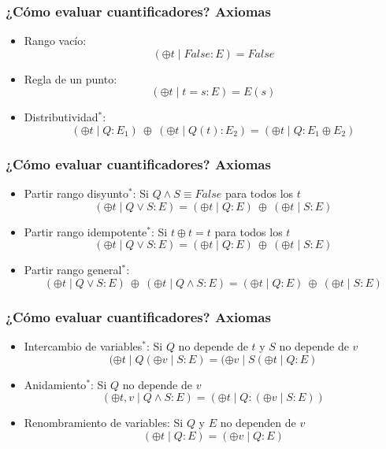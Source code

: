\documentclass{beamer}
\begin{document}
\begin{frame}[fragile]
    \frametitle{¿Cómo evaluar cuantificadores? Axiomas}
    \begin{itemize}
        \item Rango vacío: 
            $$(\oplus t \mid False: E) = False$$
        \item Regla de un punto:
            $$(\oplus t \mid t = s: E) = E(s)$$
        \item Distributividad$^{*}$:
            $$(\oplus t \mid Q: E_{1})\ \oplus\ (\oplus t \mid Q(t): E_{2}) = (\oplus t \mid Q: E_1 \oplus E_2)$$
    \end{itemize}
\end{frame}

\begin{frame}[fragile]
    \frametitle{¿Cómo evaluar cuantificadores? Axiomas}
    \begin{itemize}
        \item Partir rango disyunto$^{*}$: Si $Q \land S \equiv False$ para todos los $t$
            $$(\oplus t \mid Q \lor S : E) = (\oplus t \mid Q : E)\ \oplus\ (\oplus t \mid S : E)$$
        \item Partir rango idempotente$^{*}$: Si $t \oplus t = t$ para todos los $t$
            $$(\oplus t \mid Q \lor S : E) = (\oplus t \mid Q : E)\ \oplus\ (\oplus t \mid S : E)$$
        \item Partir rango general$^{*}$:
            $$(\oplus t \mid Q \lor S : E)\ \oplus\ (\oplus t \mid Q \land S : E) = (\oplus t \mid Q : E)\ \oplus\ (\oplus t \mid S : E)$$
    \end{itemize}
\end{frame}

\begin{frame}[fragile]
    \frametitle{¿Cómo evaluar cuantificadores? Axiomas}
    \begin{itemize}
        \item Intercambio de variables$^{*}$: Si $Q$ no depende de $t$ y $S$ no depende de $v$
            $$(\oplus t \mid Q (\oplus v \mid S : E) = (\oplus v \mid S (\oplus t \mid Q : E)$$
        \item Anidamiento$^{*}$: Si $Q$ no depende de $v$
            $$(\oplus t,v \mid Q \land S : E) = (\oplus t \mid Q : (\oplus v \mid S : E))$$
        \item Renombramiento de variables: Si $Q$ y $E$ no dependen de $v$
            $$(\oplus t \mid Q : E) = (\oplus v \mid Q : E)$$
    \end{itemize}
\end{frame}
\end{document}
